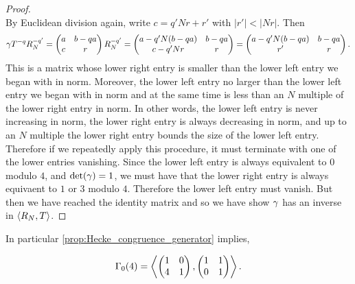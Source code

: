\documentclass[12pt,oneside]{book}
\begin{document}
\begin{proof}
\[        \]
        By Euclidean division again, write $c = q'Nr+r'$ with $|r'| < |Nr|$. Then
        \[
          \gamma T^{-q}R_{N}^{-q'} = \begin{pmatrix} a & b-qa \\ c & r \end{pmatrix}R_{N}^{-q'} = \begin{pmatrix} a-q'N(b-qa) & b-qa \\ c-q'Nr & r \end{pmatrix} =  \begin{pmatrix} a-q'N(b-qa) & b-qa \\ r' & r \end{pmatrix}.
        \]
        This is a matrix whose lower right entry is smaller than the lower left entry we began with in norm. Moreover, the lower left entry no larger than the lower left entry we began with in norm and at the same time is less than an $N$ multiple of the lower right entry in norm. In other words, the lower left entry is never increasing in norm, the lower right entry is always decreasing in norm, and up to an $N$ multiple the lower right entry bounds the size of the lower left entry. Therefore if we repeatedly apply this procedure, it must terminate with one of the lower entries vanishing. Since the lower left entry is always equivalent to $0$ modulo $4$, and $\det(\gamma) = 1$, we must have that the lower right entry is always equivaent to $1$ or $3$ modulo $4$. Therefore the lower left entry must vanish. But then we have reached the identity matrix and so we have show $\gamma$ has an inverse in $\langle R_{N},T\rangle$.
      \end{proof}

      In particular \cref{prop:Hecke_congruence_generator} implies,

      \[
        \Gamma_{0}(4) = \left\langle\begin{pmatrix} 1 & 0 \\ 4 & 1 \end{pmatrix},\begin{pmatrix} 1 & 1 \\ 0 & 1 \end{pmatrix}\right\rangle.
      \]
\end{document}

